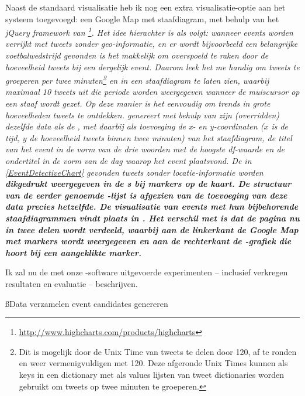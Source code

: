 {{Naast de standaard visualisatie heb ik nog een extra visualisatie-optie aan het systeem 
toegevoegd: een Google Map met staafdiagram, met behulp van het \it{jQuery framework} van 
\footnote{\url{http://www.highcharts.com/products/highcharts}}. 
Het idee hierachter is als volgt: wanneer events worden verrijkt 
met tweets zonder geo-informatie, en er wordt bijvoorbeeld een belangrijke 
voetbalwedstrijd gevonden is het makkelijk om overspoeld te raken door de 
hoeveelheid tweets bij een dergelijk event. Daarom leek het me handig om tweets te 
groeperen per twee minuten\footnote{Dit is mogelijk door de Unix Time van tweets 
te delen door 120, af te ronden en weer vermenigvuldigen met 120. Deze afgeronde 
Unix Times kunnen als keys in een dictionary met als values lijsten van tweet 
dictionaries worden gebruikt om tweets op twee minuten te groeperen.} en in een 
staafdiagram te laten zien, waarbij maximaal 10 tweets uit die periode worden 
weergegeven wanneer de muiscursor op een staaf wordt gezet. Op deze manier is 
het eenvoudig om trends in grote hoeveelheden tweets te ontdekken.
\vl
{} genereert met behulp van zijn (\it{overridden})  
dezelfde data als de , met daarbij als toevoeging de \it{x- en 
y-coordinaten} ($x$ is de tijd, $y$ de hoeveelheid tweets binnen twee minuten) van 
het staafdiagram, de \it{titel van het event} in de vorm van de drie woorden met de 
hoogste df-waarde en de \it{ondertitel} in de vorm van de dag waarop het event 
plaatsvond. De in \ref{EventDetectiveChart} gevonden tweets zonder locatie-informatie worden 
\bf{dikgedrukt} weergegeven in de s bij markers op de kaart. De structuur 
van de eerder genoemde -lijst is afgezien van de toevoeging van deze 
data precies hetzelfde.
\vl
De visualisatie van events met hun bijbehorende staafdiagrammen vindt plaats in 
. Het verschil met  is dat de pagina nu 
in twee delen wordt verdeeld, waarbij aan de linkerkant de Google Map met 
markers wordt weergegeven en aan de rechterkant de -grafiek die hoort 
bij een aangeklikte marker.

\label{resultaten}

Ik zal nu de met onze -software uitgevoerde experimenten – inclusief verkregen resultaten 
en evaluatie – beschrijven.

\ss{Data verzamelen event candidates genereren}

}}
